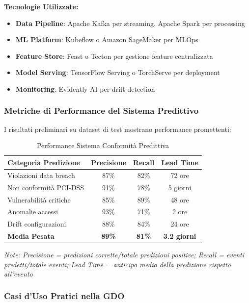 \textbf{Tecnologie Utilizzate:}
\begin{itemize}
    \item \textbf{Data Pipeline}: Apache Kafka per streaming, Apache Spark per processing
    \item \textbf{ML Platform}: Kubeflow o Amazon SageMaker per MLOps
    \item \textbf{Feature Store}: Feast o Tecton per gestione feature centralizzata
    \item \textbf{Model Serving}: TensorFlow Serving o TorchServe per deployment
    \item \textbf{Monitoring}: Evidently AI per drift detection
\end{itemize}

\subsubsection{\texorpdfstring{Metriche di Performance del Sistema Predittivo}{4.8.2.2 - Metriche di Performance del Sistema Predittivo}}

I risultati preliminari su dataset di test mostrano performance promettenti:

\begin{table}[htbp]
\centering
\caption{Performance Sistema Conformità Predittiva}
\label{tab:predictive_compliance}
\begin{tabular}{|l|c|c|c|}
\hline
\textbf{Categoria Predizione} & \textbf{Precisione} & \textbf{Recall} & \textbf{Lead Time} \\
\hline
Violazioni data breach & 87\% & 82\% & 72 ore \\
Non conformità PCI-DSS & 91\% & 78\% & 5 giorni \\
Vulnerabilità critiche & 85\% & 89\% & 48 ore \\
Anomalie accessi & 93\% & 71\% & 2 ore \\
Drift configurazioni & 88\% & 84\% & 24 ore \\
\hline
\textbf{Media Pesata} & \textbf{89\%} & \textbf{81\%} & \textbf{3.2 giorni} \\
\hline
\end{tabular}
\end{table}

\textit{Note: Precisione = predizioni corrette/totale predizioni positive; Recall = eventi predetti/totale eventi; Lead Time = anticipo medio della predizione rispetto all'evento}

\subsubsection{\texorpdfstring{Casi d'Uso Pratici nella GDO}{4.8.2.3 - Casi d'Uso Pratici nella GDO}}

